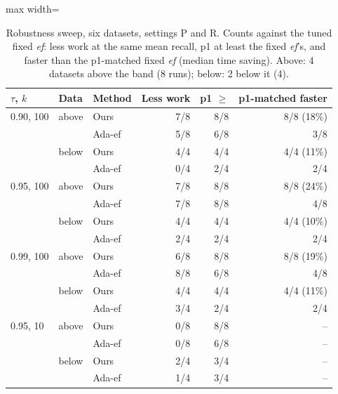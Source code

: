 \documentclass[twocolumn]{svjour3}
\newcommand{\ef}{\textit{ef}}
\begin{document}
\begin{table}[t]
  \caption{Robustness sweep, six datasets, settings P and R. Counts against the tuned fixed \ef{}:
  less work at the same mean recall, p1 at least the fixed \ef{}'s, and faster than the p1-matched
  fixed \ef{} (median time saving). Above: 4 datasets above the band (8 runs); below: 2 below it (4).}
  \label{tab:sweep}
  \centering\footnotesize\setlength{\tabcolsep}{3.5pt}
  \begin{adjustbox}{max width=\linewidth}\begin{tabular}{lllrrr}
    \toprule
    $\tau$, $k$ & Data & Method & Less work & p1 $\geq$ & p1-matched faster \\
    \midrule
    0.90, 100 & above & Ours   & 7/8 & 8/8 & 8/8 (18\%) \\
              &       & Ada-ef & 5/8 & 6/8 & 3/8 \\
              & below & Ours   & 4/4 & 4/4 & 4/4 (11\%) \\
              &       & Ada-ef & 0/4 & 2/4 & 2/4 \\
    \midrule
    0.95, 100 & above & Ours   & 7/8 & 8/8 & 8/8 (24\%) \\
              &       & Ada-ef & 7/8 & 8/8 & 4/8 \\
              & below & Ours   & 4/4 & 4/4 & 4/4 (10\%) \\
              &       & Ada-ef & 2/4 & 2/4 & 2/4 \\
    \midrule
    0.99, 100 & above & Ours   & 6/8 & 8/8 & 8/8 (19\%) \\
              &       & Ada-ef & 8/8 & 6/8 & 4/8 \\
              & below & Ours   & 4/4 & 4/4 & 4/4 (11\%) \\
              &       & Ada-ef & 3/4 & 2/4 & 2/4 \\
    \midrule
    0.95, 10  & above & Ours   & 0/8 & 8/8 & -- \\
              &       & Ada-ef & 0/8 & 6/8 & -- \\
              & below & Ours   & 2/4 & 3/4 & -- \\
              &       & Ada-ef & 1/4 & 3/4 & -- \\
    \bottomrule
  \end{tabular}\end{adjustbox}
\end{table}
\end{document}
